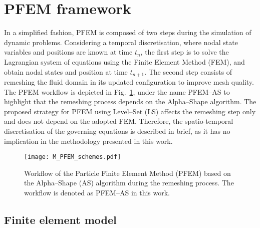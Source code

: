 \documentclass[final,3p,times]{elsarticle}
\begin{document}
\section{PFEM framework}\label{sec:PFEM-AS}

In a simplified fashion, PFEM is composed of two steps during the simulation of dynamic problems. Considering a temporal discretisation, where nodal state variables and positions are known at time $t_n$, the first step is to solve the Lagrangian system of equations using the Finite Element Method (FEM), and obtain nodal states and position at time $t_{n+1}$. The second step consists of remeshing the fluid domain in its updated configuration to improve mesh quality. The PFEM workflow is depicted in Fig.~\ref{Fig:PFEM_schemes_pdf}, under the name PFEM--AS to highlight that the remeshing process depends on the Alpha--Shape algorithm. The proposed strategy for PFEM using Level--Set (LS) affects the remeshing step only and does not depend on the adopted FEM. Therefore, the spatio-temporal discretisation of the governing equations is described in brief, as it has no implication in the methodology presented in this work. 


\begin{figure}[t] \captionsetup[sub]{font=normalsize}
	\centering 
	\texttt{[image: M\_PFEM\_schemes.pdf]}
	\caption{Workflow of the Particle Finite Element Method (PFEM) based on the Alpha--Shape (AS) algorithm during the remeshing process. The workflow is denoted as PFEM--AS in this work.}
	\label{Fig:PFEM_schemes_pdf}
\end{figure}


\subsection{Finite element model}
\end{document}
